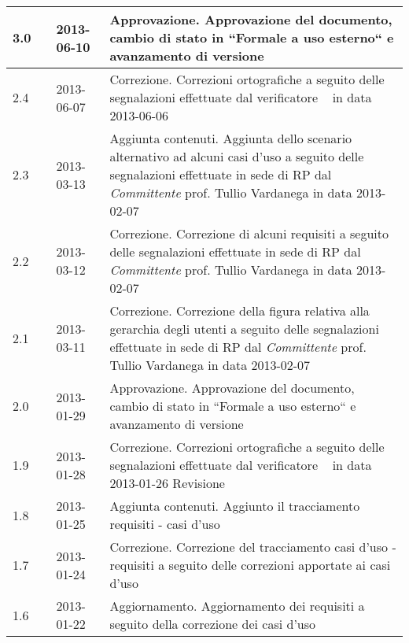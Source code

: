 \begin{longtable}{p{} p{} p{} p{}}
	    \midrule
	    3.0	&	\VP		&	2013-06-10		& Approvazione. \newline Approvazione del documento, cambio di stato in ``Formale a uso esterno`` e avanzamento di versione\\
	    \midrule
	    	2.4	&	\AB		&	2013-06-07		& Correzione. \newline Correzioni ortografiche a seguito delle segnalazioni effettuate dal verificatore \SL~ in data 2013-06-06\\
	    \midrule
	    	2.3 &	\AB		&	2013-03-13		& Aggiunta contenuti. \newline Aggiunta dello scenario alternativo ad alcuni casi d'uso a seguito delle segnalazioni effettuate in sede di RP dal \emph{Committente} prof. Tullio Vardanega in data 2013-02-07\\
	    \midrule
	    	2.2 &	\AB		&	2013-03-12		& Correzione. \newline Correzione di alcuni requisiti a seguito delle segnalazioni effettuate in sede di RP dal \emph{Committente} prof. Tullio Vardanega in data 2013-02-07\\
	    \midrule
	    	2.1 &	\AB		&	2013-03-11		& Correzione. \newline Correzione della figura relativa alla gerarchia degli utenti a seguito delle segnalazioni effettuate in sede di RP dal \emph{Committente} prof. Tullio Vardanega in data 2013-02-07\\
	    \midrule
	    	2.0 &	\MB 	&	2013-01-29		& Approvazione. \newline Approvazione del documento, cambio di stato in ``Formale a uso esterno`` e avanzamento di versione\\
	    \midrule
	    	1.9 &	\VP &	2013-01-28		& Correzione. \newline Correzioni ortografiche a seguito delle segnalazioni effettuate dal verificatore \AB~ in data 2013-01-26
									\newline Revisione \\
	    \midrule
	    	1.8 &	\EZ &	2013-01-25		& Aggiunta contenuti. \newline Aggiunto il tracciamento requisiti - casi d'uso\\
	    \midrule
	    	1.7 & 	\EZ &	2013-01-24		& Correzione. \newline Correzione del tracciamento casi d'uso - requisiti a seguito delle correzioni apportate ai casi d'uso\\
	    \midrule
	    	1.6 &	\EZ &	2013-01-22		& Aggiornamento. \newline Aggiornamento dei requisiti a seguito della correzione dei casi d'uso\\

\end{longtable}
